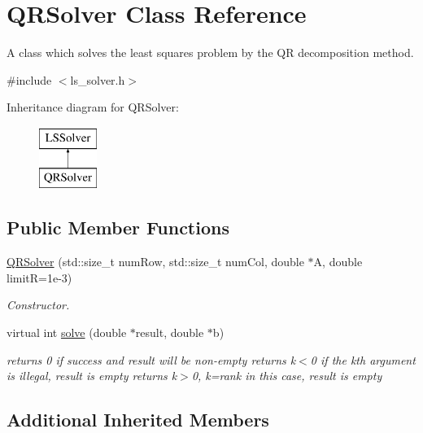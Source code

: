 \hypertarget{classQRSolver}{\section{Q\-R\-Solver Class Reference}
\label{classQRSolver}
}


A class which solves the least squares problem by the Q\-R decomposition method.  




{\ttfamily \#include $<$ls\-\_\-solver.\-h$>$}

Inheritance diagram for Q\-R\-Solver\-:\begin{figure}[H]
\begin{center}
\leavevmode
\includegraphics[height=2.000000cm]{classQRSolver}
\end{center}
\end{figure}
\subsection*{Public Member Functions}
\begin{DoxyCompactItemize}
\item 
\hyperlink{classQRSolver_a600df2e8894c46f1e0c0e7bf6424ce20}{Q\-R\-Solver} (std\-::size\-\_\-t num\-Row, std\-::size\-\_\-t num\-Col, double $\ast$A, double limit\-R=1e-\/3)
\begin{DoxyCompactList}\small\item\em Constructor. \end{DoxyCompactList}\item 
virtual int \hyperlink{classQRSolver_a23ab430c142684c6906793511d81c3de}{solve} (double $\ast$result, double $\ast$b)
\begin{DoxyCompactList}\small\item\em returns 0 if success and result will be non-\/empty returns k$<$0 if the kth argument is illegal, result is empty returns k$>$0, k=rank in this case, result is empty \end{DoxyCompactList}\end{DoxyCompactItemize}
\subsection*{Additional Inherited Members}


